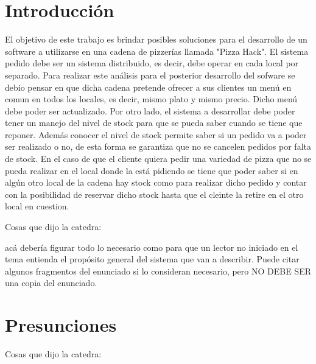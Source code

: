 \documentclass[a4paper,10pt]{article}
\begin{document}
\tableofcontents

\newpage


\section*{Introducci\'on}

El objetivo de este trabajo es brindar posibles soluciones para el desarrollo de un software a utilizarse en una cadena de pizzer\'ias llamada "Pizza Hack". El sistema pedido debe ser un sistema distribuido, es decir, debe operar en cada local por separado. Para realizar este an\'alisis para el posterior desarrollo del sofware se debio pensar en que dicha cadena pretende ofrecer a sus clientes un men\'u en comun en todos los locales, es decir, mismo plato y mismo precio. Dicho men\'u debe poder ser actualizado. Por otro lado, el sistema a desarrollar debe poder tener un manejo del nivel de stock para que se pueda saber cuando se tiene que reponer. Adem\'as conocer el nivel de stock permite saber si un pedido va a poder ser realizado o no, de esta forma se garantiza que no se cancelen pedidos por falta de stock. En el caso de que el cliente quiera pedir una variedad de pizza que no se pueda realizar en el local donde la est\'a pidiendo se tiene que poder saber si en alg\'un otro local de la cadena hay stock como para realizar dicho pedido y contar con la posibilidad de reservar dicho stock hasta que el cleinte la retire en el otro local en cuestion.

Cosas que dijo la catedra:

acá debería figurar todo lo necesario como para que un
lector no iniciado en el tema entienda el propósito general del
sistema que van a describir. Puede citar algunos fragmentos del
enunciado si lo consideran necesario, pero NO DEBE SER una copia del
enunciado.

\section*{Presunciones}

Cosas que dijo la catedra:
\end{document}
